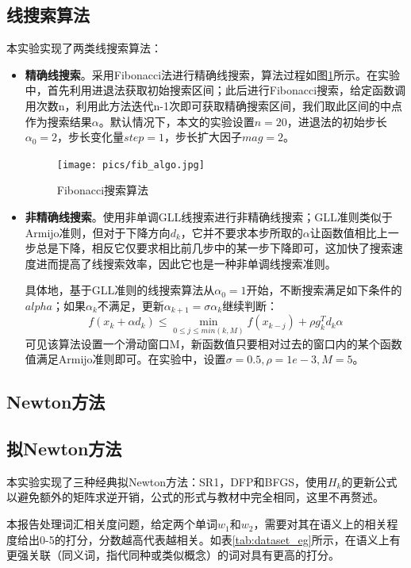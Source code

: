 \documentclass{article}
\begin{document}
\subsection{线搜索算法}
本实验实现了两类线搜索算法：
\begin{itemize}
  \item \textbf{精确线搜索}。采用Fibonacci法进行精确线搜索，算法过程如图\ref{fig:fib_algo}所示。在实验中，首先利用进退法获取初始搜索区间；此后进行Fibonacci搜索，给定函数调用次数n，利用此方法迭代n-1次即可获取精确搜索区间，我们取此区间的中点作为搜索结果$\alpha$。默认情况下，本文的实验设置$n=20$，进退法的初始步长$\alpha_0=2$，步长变化量$step=1$，步长扩大因子$mag=2$。
  \begin{figure}[h]
    \centering
    \texttt{[image: pics/fib\_algo.jpg]}
    \caption{Fibonacci搜索算法}
    \label{fig:fib_algo}
  \end{figure}
  \item \textbf{非精确线搜索}。使用非单调GLL线搜索进行非精确线搜索；GLL准则类似于Armijo准则，但对于下降方向$d_k$，它并不要求本步所取的$\alpha$让函数值相比上一步总是下降，相反它仅要求相比前几步中的某一步下降即可，这加快了搜索速度进而提高了线搜索效率，因此它也是一种非单调线搜索准则。
  
  具体地，基于GLL准则的线搜索算法从$\alpha_0 = 1$开始，不断搜索满足如下条件的$alpha$；如果$\alpha_k$不满足，更新$\alpha_{k+1} = \sigma\alpha_k$继续判断：
  \[ f(x_k + \alpha d_k) \leq \min\limits_{0\leq j \leq min(k, M)} f(x_{k-j}) + \rho g_k^T d_k \alpha \]
  可见该算法设置一个滑动窗口M，新函数值只要相对过去的窗口内的某个函数值满足Armijo准则即可。在实验中，设置$\sigma=0.5, \rho=1e-3, M=5$。
\end{itemize}


\subsection{Newton方法}



\subsection{拟Newton方法}
本实验实现了三种经典拟Newton方法：SR1，DFP和BFGS，使用$H_k$的更新公式以避免额外的矩阵求逆开销，公式的形式与教材中完全相同，这里不再赘述。


本报告处理词汇相关度问题，给定两个单词$w_1$和$w_2$，需要对其在语义上的相关程度给出0-5的打分，分数越高代表越相关。如表\ref{tab:dataset_eg}所示，在语义上有更强关联（同义词，指代同种或类似概念）的词对具有更高的打分。
\end{document}
